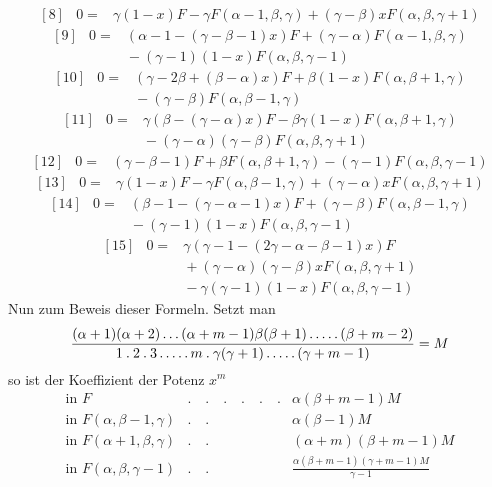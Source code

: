 \[
\begin{array}{rcl}
{[8]}&0=&\gamma(1-x)F-\gamma F(\alpha-1,\beta,\gamma)+(\gamma-\beta)xF(\alpha,\beta,\gamma+1)
\end{array}
\]
\[
\begin{array}{rcl}
{[9]}&0=&(\alpha-1-(\gamma-\beta-1)x)F+(\gamma-\alpha)F(\alpha-1,\beta,\gamma)\\
&&{}-(\gamma-1)(1-x)F(\alpha,\beta,\gamma-1)
\end{array}
\]
\[
\begin{array}{rcl}
{[10]}&0=&(\gamma-2\beta+(\beta-\alpha)x)F+\beta(1-x)F(\alpha,\beta+1,\gamma)\\
&&{}-(\gamma-\beta)F(\alpha,\beta-1,\gamma)
\end{array}
\]
\[
\begin{array}{rcl}
{[11]}&0=&\gamma(\beta-(\gamma-\alpha)x)F-\beta\gamma(1-x)F(\alpha,\beta+1,\gamma)\\
&&{}-(\gamma-\alpha)(\gamma-\beta)F(\alpha,\beta,\gamma+1)
\end{array}
\]
\[
\begin{array}{rcl}
{[12]}&0=&(\gamma-\beta-1)F+\beta F(\alpha,\beta+1,\gamma)-(\gamma-1)F(\alpha,\beta,\gamma-1)
\end{array}
\]
\[
\begin{array}{rcl}
{[13]}&0=&\gamma(1-x)F-\gamma F(\alpha,\beta-1,\gamma)+(\gamma-\alpha)xF(\alpha,\beta,\gamma+1)
\end{array}
\]
\[
\begin{array}{rcl}
{[14]}&0=&(\beta-1-(\gamma-\alpha-1)x)F+(\gamma-\beta)F(\alpha,\beta-1,\gamma)\\
&&{}-(\gamma-1)(1-x)F(\alpha,\beta,\gamma-1)
\end{array}
\]
\[
\begin{array}{rcl}
{[15]}&0=&\gamma(\gamma-1-(2\gamma-\alpha-\beta-1)x)F\\
&&{}+(\gamma-\alpha)(\gamma-\beta)xF(\alpha,\beta,\gamma+1)\\
&&{}-\gamma(\gamma-1)(1-x)F(\alpha,\beta,\gamma-1)
\end{array}
\]
Nun zum Beweis dieser Formeln. Setzt man
\[
\frac{(\alpha+1)(\alpha+2)\mathinner{.\,.\,.}(\alpha+m-1)\beta(\beta+1)\mathinner{.\,.\,.\,.\,.}(\beta+m-2)}{1\mathbin{.}2\mathbin{.}3\mathinner{.\,.\,.\,.\,.}m\mathbin{.}\gamma(\gamma+1)\mathinner{.\,.\,.\,.\,.}(\gamma+m-1)}=M
\]
so ist der Koeffizient der Potenz $x^m$
\[
\begin{array}{lll}
\mbox{in }F&.\quad.\quad.\quad.\quad.\quad.&\alpha(\beta+m-1)M\\
\mbox{in }F(\alpha,\beta-1,\gamma)&.\quad.&\alpha(\beta-1)M\\
\mbox{in }F(\alpha+1,\beta,\gamma)&.\quad.&(\alpha+m)(\beta+m-1)M\\
\mbox{in }F(\alpha,\beta,\gamma-1)&.\quad.&\frac{\alpha(\beta+m-1)(\gamma+m-1)M}{\gamma-1}
\end{array}
\]
